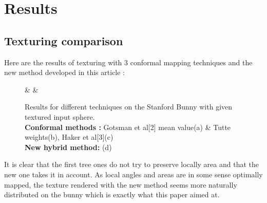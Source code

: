 \documentclass[11pt,a4paper]{article}
\begin{document}
\clearpage
\section{Results}

\subsection{Texturing comparison}

Here are the results of texturing with 3 conformal mapping techniques and the new method developed in this article :

\begin{figure}[H]
     &
    &
    \caption{Results for different techniques on the Stanford Bunny with given textured input sphere.\\
        \textbf{Conformal methods :} Gotsman et al[2] mean value(a) \& Tutte weights(b), Haker et al[3](c)\\
        \textbf{New hybrid method:} (d)}
\end{figure}

It is clear that the first tree ones do not try to preserve locally area and that the new one takes it in account. As local angles and areas are in some sense optimally mapped, the texture rendered with the new method seems more naturally distributed on the bunny which is exactly what this paper aimed at.
\end{document}

